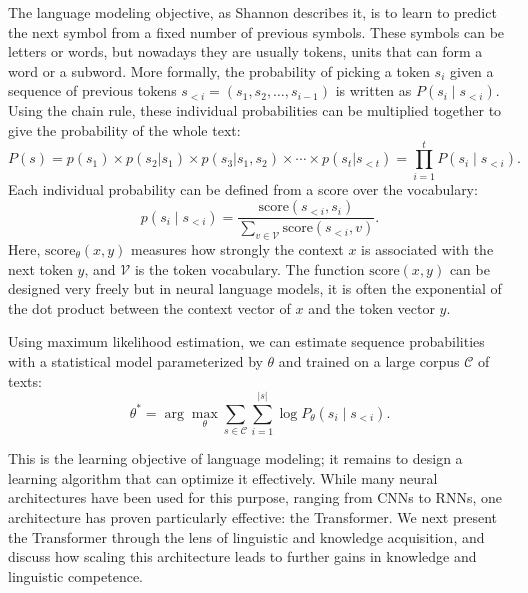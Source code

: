 The language modeling objective, as Shannon describes it, is to learn to predict
the next symbol from a fixed number of previous symbols.
These symbols can be letters or words, but nowadays they are usually tokens, units that can form a word or a subword. 
More formally, the probability of picking a token $s_i$ given a sequence of previous tokens $s_{<i} = (s_1, s_2, \ldots, s_{i-1})$ is written as $P(s_i \mid s_{<i})$.
Using the chain rule, these individual probabilities can be multiplied together to give the probability of the whole text:
\begin{equation}
    P(s) = p(s_1) \times p(s_2 | s_1) \times p(s_3 | s_{1}, s_{2}) \times \cdots \times p(s_t | s_{<t}) = \prod_{i=1}^t P(s_i \mid s_{<i}).
\end{equation}
Each individual probability can be defined from a score over the vocabulary:
\begin{equation}
    p(s_i \mid s_{<i}) =
    \frac{\mathrm{score}(s_{<i}, s_i)}
    {\sum_{v \in \mathcal{V}} \mathrm{score}(s_{<i}, v)}.
\end{equation}
Here, $\mathrm{score}_\theta(x, y)$ measures how strongly the context $x$ is associated with the next token $y$, and $\mathcal{V}$ is the token vocabulary.
The function $\mathrm{score}(x, y)$ can be designed very freely but in neural language models, it is often the exponential of the dot product
between the context vector of $x$ and the token vector $y$.

Using maximum likelihood estimation, we can estimate sequence probabilities with a statistical model parameterized
by $\theta$ and trained on a large corpus $\mathcal{C}$ of texts:
\begin{equation}
    \theta^* = \arg\max_\theta
    \sum_{s \in \mathcal{C}} \sum_{i=1}^{|s|}
    \log P_\theta(s_i \mid s_{<i}).
\end{equation}

This is the learning objective of language modeling; it remains to design a learning algorithm 
that can optimize it effectively. While many neural architectures have been used for this 
purpose, ranging from CNNs to RNNs, one architecture has proven particularly effective: 
the Transformer. We next present the Transformer through the lens of linguistic 
and knowledge acquisition, and discuss how scaling this architecture leads to further gains 
in knowledge and linguistic competence.

